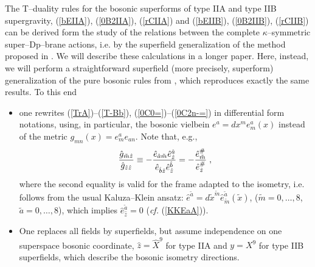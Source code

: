 \documentclass[a4paper,11pt]{article}
\begin{document}
The T--duality rules for the 
bosonic superforms of type IIA and type IIB supergravity, 
(\ref{bEIIA}), 
(\ref{0B2IIA}), (\ref{rCIIA})
and 
(\ref{bEIIB}),  (\ref{0B2IIB}), (\ref{rCIIB}) 
can be derived form the study of the relations between the  
complete $\kappa$--symmetric  super--Dp--brane actions, i.e.  
by the superfield generalization of the method proposed in \cite{simon}.
We will describe these calculations in a longer paper. 
Here, instead, we will perform a straightforward superfield 
(more precisely, superform) generalization of the pure bosonic 
rules from \cite{simon}, which reproduces exactly the same results. 
To this end
\begin{itemize}
\item one rewrites (\ref{TrA})--(\ref{T-Bb}),   
(\ref{0C0=})--(\ref{0C2n-=})
in differential form notations, using, in particular, the bosonic 
vielbein $e^{ {a}}= dx^{ {m}}
e^{ {a}}_{ {m}}(x)$ instead of the metric 
$g_{ {m} {n}}(x)= e^{ {a}}_{ {m}}e_{ {a} {n}}$. Note that, e.g.,  
\begin{eqnarray}\label{g/gzz}
{\hat{g}_{\tilde{m}\hat{z}}\over \hat{g}_{\hat{z}\hat{z}}} \equiv  
- {\hat{e}_{\hat{a}\tilde{m}}\hat{e}^{\hat{a}}_{\hat{z}} 
\over \hat{e}_{\hat{b}\hat{z}}\hat{e}^{\hat{b}}_{\hat{z}}} = 
- {\hat{e}^{\#}_{\tilde{m}} 
\over \hat{e}^{\#}_{\hat{z}}} \; , 
\end{eqnarray}
where the second equality is valid for the frame adapted to the 
isometry, i.e. follows from the usual  
Kaluza--Klein ansatz: 
$\hat{e}^{\tilde{a}}= d\tilde{x}^{\tilde{m}} \hat{e}_{\tilde{m}}^{\tilde{a}}
(\tilde{x})$, ($\tilde{m}=0, \ldots , 8$, $\tilde{a}=0, \ldots , 8$), 
which implies $\hat{e}^{\tilde{a}}_{\hat{z}}=0$ ({\it cf.} (\ref{KKEaA})). 

\item One replaces all  fields by superfields, but assume independence  
on one superspace bosonic coordinate, 
$\hat{z}=\hat{X}^{9}$ for type IIA  and $y=X^9$ for type IIB superfields, 
which describe  the bosonic isometry directions.   
\end{itemize} 
\end{document}
